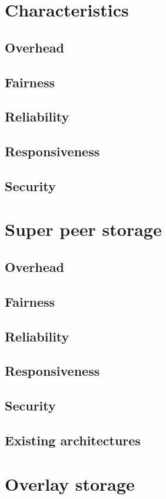     \section{Characteristics}
        \subsection{Overhead}
        \subsection{Fairness}
        \subsection{Reliability}
        \subsection{Responsiveness}
        \subsection{Security}
    \section{Super peer storage}
        \subsection{Overhead}
        \subsection{Fairness}
        \subsection{Reliability}
        \subsection{Responsiveness}
        \subsection{Security}
        \subsection{Existing architectures}
    \section{Overlay storage}
